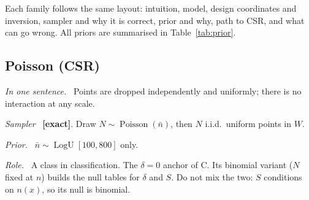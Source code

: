 \documentclass[10pt,a4paper]{article}
\newcommand{\exact}{\textcolor{green!45!black}{\textbf{[exact]}}}
\newcommand{\nbar}{\bar n}
\newcommand{\LogU}{\operatorname{LogU}}
\newcommand{\Pois}{\operatorname{Poisson}}
\newcommand{\sub}[1]{\par\textit{#1}\ }
\begin{document}
Each family follows the same layout: intuition, model, design coordinates and inversion, sampler and why it is correct, prior and why, path to CSR, and what can go wrong. All priors are summarised in Table~\ref{tab:prior}.

\subsection{Poisson (CSR)}
\sub{In one sentence.} Points are dropped independently and uniformly; there is no interaction at any scale.
\sub{Sampler} \exact. Draw $N\sim\Pois(\nbar)$, then $N$ i.i.d.\ uniform points in $W$.
\sub{Prior.} $\nbar\sim\LogU[100,800]$ only.
\sub{Role.} A class in classification. The $\delta=0$ anchor of C. Its binomial variant ($N$ fixed at $n$) builds the null tables for $\delta$ and $S$. Do not mix the two: $S$ conditions on $n(x)$, so its null is binomial.
\end{document}
